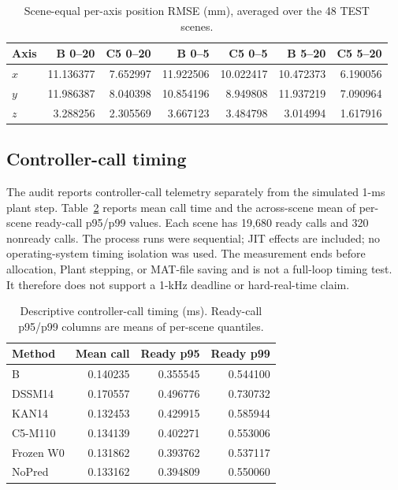 \documentclass[11pt]{article}
\begin{document}
\begin{table}[t]
\centering
\small
\caption{Scene-equal per-axis position RMSE (mm), averaged over the 48 TEST scenes.}
\label{tab:axis}
\begin{tabular}{lrrrrrr}
\toprule
Axis & B 0--20 & C5 0--20 & B 0--5 & C5 0--5 & B 5--20 & C5 5--20 \\
\midrule
$x$ & 11.136377 & 7.652997 & 11.922506 & 10.022417 & 10.472373 & 6.190056 \\
$y$ & 11.986387 & 8.040398 & 10.854196 & 8.949808 & 11.937219 & 7.090964 \\
$z$ & 3.288256 & 2.305569 & 3.667123 & 3.484798 & 3.014994 & 1.617916 \\
\bottomrule
\end{tabular}
\end{table}

\subsection{Controller-call timing}
The audit reports controller-call telemetry separately from the simulated 1-ms plant step. Table~\ref{tab:timing} reports mean call time and the across-scene mean of per-scene ready-call p95/p99 values. Each scene has 19,680 ready calls and 320 nonready calls. The process runs were sequential; JIT effects are included; no operating-system timing isolation was used. The measurement ends before allocation, Plant stepping, or MAT-file saving and is not a full-loop timing test. It therefore does not support a 1-kHz deadline or hard-real-time claim.

\begin{table}[t]
\centering
\small
\caption{Descriptive controller-call timing (ms). Ready-call p95/p99 columns are means of per-scene quantiles.}
\label{tab:timing}
\begin{tabular}{lrrr}
\toprule
Method & Mean call & Ready p95 & Ready p99 \\
\midrule
B & 0.140235 & 0.355545 & 0.544100 \\
DSSM14 & 0.170557 & 0.496776 & 0.730732 \\
KAN14 & 0.132453 & 0.429915 & 0.585944 \\
C5-M110 & 0.134139 & 0.402271 & 0.553006 \\
Frozen W0 & 0.131862 & 0.393762 & 0.537117 \\
NoPred & 0.133162 & 0.394809 & 0.550060 \\
\bottomrule
\end{tabular}
\end{table}
\end{document}
